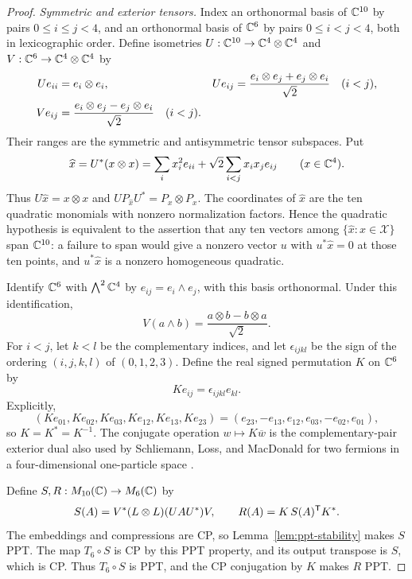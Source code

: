 \begin{proof}
\emph{Symmetric and exterior tensors.}
Index an orthonormal basis of $\mathbb C^{10}$ by pairs $0\leq i\leq j<4$, and an
orthonormal basis of $\mathbb C^6$ by pairs $0\leq i<j<4$, both in lexicographic
order.  Define isometries $U:\mathbb C^{10}\to\mathbb C^4\otimes\mathbb C^4$ and
$V:\mathbb C^6\to\mathbb C^4\otimes\mathbb C^4$ by
\begin{align}
 Ue_{ii}&=e_i\otimes e_i,&
 Ue_{ij}&=\frac{e_i\otimes e_j+e_j\otimes e_i}{\sqrt2}\quad(i<j),
 \notag\\
 Ve_{ij}&=\frac{e_i\otimes e_j-e_j\otimes e_i}{\sqrt2}\quad(i<j).
 \label{eq:UV}
\end{align}
Their ranges are the symmetric and antisymmetric tensor subspaces.  Put
\begin{equation}
 \widehat x=U^*(x\otimes x)
 =\sum_i x_i^2e_{ii}+\sqrt2\sum_{i<j}x_ix_je_{ij}
 \qquad(x\in\mathbb C^4).
 \label{eq:veronese}
\end{equation}
Thus $U\widehat x=x\otimes x$ and
$UP_{\widehat x}U^*=P_x\otimes P_x$.  The coordinates of $\widehat x$ are
the ten quadratic monomials with nonzero normalization factors.  Hence the
quadratic hypothesis is equivalent to the assertion that any ten vectors
among $\{\widehat x:x\in\mathcal X\}$ span $\mathbb C^{10}$: a failure to span
would give a nonzero vector $u$ with $u^*\widehat x=0$ at those ten points,
and $u^*\widehat x$ is a nonzero homogeneous quadratic.

Identify $\mathbb C^6$ with $\bigwedge^2\mathbb C^4$ by $e_{ij}=e_i\wedge e_j$, with this
basis orthonormal.  Under this identification,
\[
 V(a\wedge b)=\frac{a\otimes b-b\otimes a}{\sqrt2}.
\]
For $i<j$, let $k<l$ be the complementary indices, and let
$\epsilon_{ijkl}$ be the sign of the ordering $(i,j,k,l)$ of $(0,1,2,3)$.
Define the real signed permutation $K$ on $\mathbb C^6$ by
\begin{equation}
 Ke_{ij}=\epsilon_{ijkl}e_{kl}.
 \label{eq:complement}
\end{equation}
Explicitly,
\[
 (Ke_{01},Ke_{02},Ke_{03},Ke_{12},Ke_{13},Ke_{23})
 =(e_{23},-e_{13},e_{12},e_{03},-e_{02},e_{01}),
\]
so $K=K^*=K^{-1}$.  The conjugate operation $w\mapsto K\overline w$ is
the complementary-pair exterior dual also used by Schliemann, Loss, and
MacDonald for two fermions in a four-dimensional one-particle space
\cite[Section III, Equations (26)--(28)]{SchliemannLossMacDonald2001}.

Define $S,R:M_{10}(\mathbb C)\to M_{6}(\mathbb C)$ by
\begin{equation}
 S(A)=V^*(L\otimes L)(UAU^*)V,\qquad
 R(A)=K\,S(A)^{\mathsf T}K^*.
 \label{eq:SR}
\end{equation}
The embeddings and compressions are CP, so Lemma~\ref{lem:ppt-stability}
makes $S$ PPT.  The map $T_6\circ S$ is CP by this PPT property, and its
output transpose is $S$, which is CP.  Thus $T_6\circ S$ is PPT, and the
CP conjugation by $K$ makes $R$ PPT.


\end{proof}
